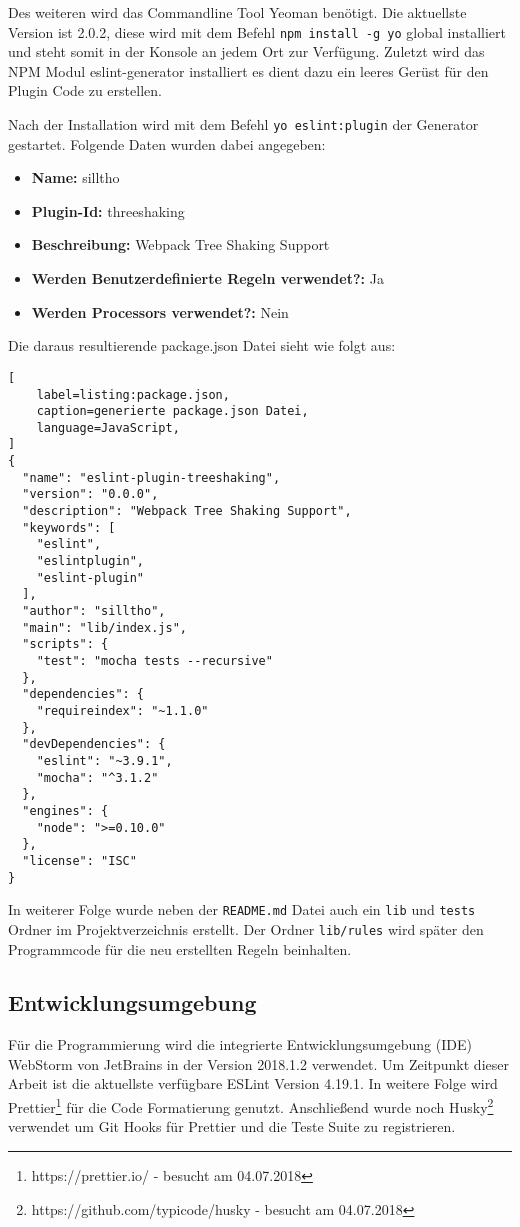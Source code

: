 Des weiteren wird das Commandline Tool Yeoman benötigt. Die aktuellste Version ist 2.0.2, diese wird mit dem Befehl \lstinline{npm install -g yo} global installiert und steht somit in der Konsole an jedem Ort zur Verfügung. Zuletzt wird das NPM Modul eslint-generator installiert es dient dazu ein leeres Gerüst für den Plugin Code zu erstellen.

Nach der Installation wird mit dem Befehl \lstinline{yo eslint:plugin} der Generator gestartet. Folgende Daten wurden dabei angegeben:
\begin{itemize}
	\item \textbf{Name:} silltho
    \item \textbf{Plugin-Id:} threeshaking
    \item \textbf{Beschreibung:} Webpack Tree Shaking Support
    \item \textbf{Werden Benutzerdefinierte Regeln verwendet?:} Ja
    \item \textbf{Werden Processors verwendet?:} Nein
\end{itemize}

Die daraus resultierende package.json Datei sieht wie folgt aus:

\begin{lstlisting}[
    label=listing:package.json,
	caption=generierte package.json Datei,
	language=JavaScript,
]
{
  "name": "eslint-plugin-treeshaking",
  "version": "0.0.0",
  "description": "Webpack Tree Shaking Support",
  "keywords": [
    "eslint",
    "eslintplugin",
    "eslint-plugin"
  ],
  "author": "silltho",
  "main": "lib/index.js",
  "scripts": {
    "test": "mocha tests --recursive"
  },
  "dependencies": {
    "requireindex": "~1.1.0"
  },
  "devDependencies": {
    "eslint": "~3.9.1",
    "mocha": "^3.1.2"
  },
  "engines": {
    "node": ">=0.10.0"
  },
  "license": "ISC"
}
\end{lstlisting}

In weiterer Folge wurde neben der \lstinline{README.md} Datei auch ein \lstinline{lib} und \lstinline{tests} Ordner im Projektverzeichnis erstellt. Der Ordner \lstinline{lib/rules} wird später den Programmcode für die neu erstellten Regeln beinhalten.

\subsection{Entwicklungsumgebung}
Für die Programmierung wird die integrierte Entwicklungsumgebung (IDE) WebStorm von JetBrains in der Version 2018.1.2 verwendet. Um Zeitpunkt dieser Arbeit ist die aktuellste verfügbare ESLint Version 4.19.1. In weitere Folge wird Prettier\footnote{https://prettier.io/ - besucht am 04.07.2018} für die Code Formatierung genutzt. Anschließend wurde noch Husky\footnote{https://github.com/typicode/husky - besucht am 04.07.2018} verwendet um Git Hooks für Prettier und die Teste Suite zu registrieren.


